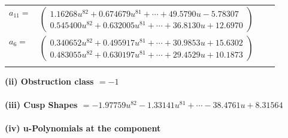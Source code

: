 \documentclass[1p]{elsarticle_modified}
\theoremstyle{definition}
\begin{document}
\begin{tabular}{m{7pt} m{180pt} m{7pt} m{180pt} }
\flushright $a_{11}=$&$\begin{pmatrix}1.16268 u^{82}+0.674679 u^{81}+\cdots+49.5790 u-5.78307\\0.545400 u^{82}+0.632005 u^{81}+\cdots+36.8130 u+12.6970\end{pmatrix}$ \\
\flushright $a_{6}=$&$\begin{pmatrix}0.340652 u^{82}+0.495917 u^{81}+\cdots+30.9853 u+15.6302\\0.483055 u^{82}+0.630197 u^{81}+\cdots+29.4529 u+10.1873\end{pmatrix}$\\&\end{tabular}
\flushleft \textbf{(ii) Obstruction class $= -1$}\\~\\
\flushleft \textbf{(iii) Cusp Shapes $= -1.97759 u^{82}-1.33141 u^{81}+\cdots-38.4761 u+8.31564$}\\~\\
\newpage\renewcommand{\arraystretch}{1}
\flushleft \textbf{(iv) u-Polynomials at the component}\newline \\
\end{document}
